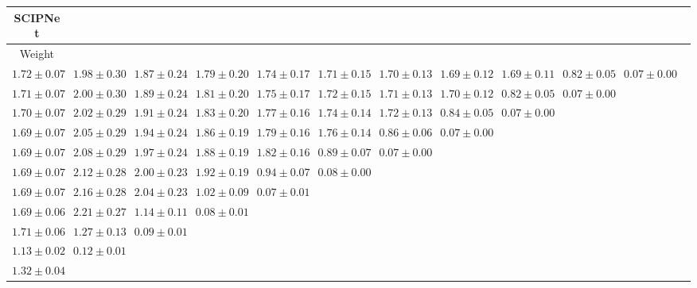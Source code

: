 \begin{table}[ht]
{{\begin{adjustbox}{width=\textwidth}
\begin{tabular}{cccccccccccc}
\hline
SCIPNet &  &  &  &  &  &  &  &  &  & \\
\hline
Weight &  &  &  &  &  &  &  &  &  & \\
\hline
$1.72 \pm 0.07$ & $1.98 \pm 0.30$ & $1.87 \pm 0.24$ & $1.79 \pm 0.20$ & $1.74 \pm 0.17$ & $1.71 \pm 0.15$ & $1.70 \pm 0.13$ & $1.69 \pm 0.12$ & $1.69 \pm 0.11$ & $0.82 \pm 0.05$ & $0.07 \pm 0.00$ &  \\
$1.71 \pm 0.07$ & $2.00 \pm 0.30$ & $1.89 \pm 0.24$ & $1.81 \pm 0.20$ & $1.75 \pm 0.17$ & $1.72 \pm 0.15$ & $1.71 \pm 0.13$ & $1.70 \pm 0.12$ & $0.82 \pm 0.05$ & $0.07 \pm 0.00$ &  &  \\
$1.70 \pm 0.07$ & $2.02 \pm 0.29$ & $1.91 \pm 0.24$ & $1.83 \pm 0.20$ & $1.77 \pm 0.16$ & $1.74 \pm 0.14$ & $1.72 \pm 0.13$ & $0.84 \pm 0.05$ & $0.07 \pm 0.00$ &  &  &  \\
$1.69 \pm 0.07$ & $2.05 \pm 0.29$ & $1.94 \pm 0.24$ & $1.86 \pm 0.19$ & $1.79 \pm 0.16$ & $1.76 \pm 0.14$ & $0.86 \pm 0.06$ & $0.07 \pm 0.00$ &  &  &  &  \\
$1.69 \pm 0.07$ & $2.08 \pm 0.29$ & $1.97 \pm 0.24$ & $1.88 \pm 0.19$ & $1.82 \pm 0.16$ & $0.89 \pm 0.07$ & $0.07 \pm 0.00$ &  &  &  &  &  \\
$1.69 \pm 0.07$ & $2.12 \pm 0.28$ & $2.00 \pm 0.23$ & $1.92 \pm 0.19$ & $0.94 \pm 0.07$ & $0.08 \pm 0.00$ &  &  &  &  &  &  \\
$1.69 \pm 0.07$ & $2.16 \pm 0.28$ & $2.04 \pm 0.23$ & $1.02 \pm 0.09$ & $0.07 \pm 0.01$ &  &  &  &  &  &  &  \\
$1.69 \pm 0.06$ & $2.21 \pm 0.27$ & $1.14 \pm 0.11$ & $0.08 \pm 0.01$ &  &  &  &  &  &  &  &  \\
$1.71 \pm 0.06$ & $1.27 \pm 0.13$ & $0.09 \pm 0.01$ &  &  &  &  &  &  &  &  &  \\
$1.13 \pm 0.02$ & $0.12 \pm 0.01$ &  &  &  &  &  &  &  &  &  &  \\
$1.32 \pm 0.04$ &  &  &  &  &  &  &  &  &  &  &  \\

\end{tabular}
\end{adjustbox}
}
}

\end{table}
